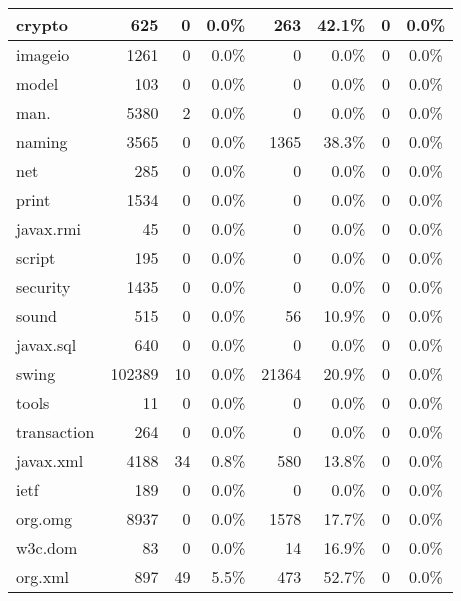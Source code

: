\begin{table}[t]
\begin{SmallOut}
\begin {tabular} {|p{3.6em}|r|r|r|r|r|c|c|}
\hline
crypto        &  \hfill 625   &  0    &  0.0\%  &  263  &  42.1\%  &  0    & 0.0\%\\
\hline
imageio      &  \hfill 1261   &  0    &  0.0\%  &  0    &  0.0\%  & 0      & 0.0\%\\
\hline
model       &  \hfill 103    & 0     &  0.0\%  & 0     &  0.0\%  & 0    & 0.0\%\\
\hline
man.   &  \hfill 5380   & 2    &   0.0\%  & 0     &  0.0\%  & 0    & 0.0\%  \\
\hline
naming       &  \hfill 3565   & 0    &   0.0\%  & 1365   &  38.3\%  &  0    & 0.0\%  \\
\hline
net           &  \hfill 285    & 0     &  0.0\%  &  0     &  0.0\%   &  0   & 0.0\%\\
\hline
print         &  \hfill 1534   & 0     &  0.0\%  &  0    &  0.0\%   &  0   & 0.0\% \\
\hline
javax.rmi           &  \hfill 45     &  0    &  0.0\%  & 0     &  0.0\%   & 0   & 0.0\%\\
\hline
script         &  \hfill 195   & 0     &  0.0\% &  0     &  0.0\%  & 0  & 0.0\%\\
\hline
security       &  \hfill 1435  & 0     &  0.0\%  & 0     &  0.0\%  & 0    & 0.0\%\\
\hline
sound          &  \hfill 515   & 0    &  0.0\%  & 56    &  10.9\%  & 0   & 0.0\%  \\
\hline
javax.sql            &  \hfill 640   & 0    &  0.0\%  & 0     &  0.0\%   & 0   & 0.0\%  \\
\hline
swing          &  102389& 10   &  0.0\%  &  21364 &  20.9\%   &  0   & 0.0\%\\
\hline
tools          &  \hfill 11    & 0     &  0.0\%  &  0    &  0.0\%   &  0   & 0.0\% \\
\hline
transaction    &  \hfill 264   &  0    &  0.0\%  & 0     &  0.0\%   & 0   & 0.0\%\\
\hline
javax.xml            &  \hfill 4188  &  34   &  0.8\% &  580   &  13.8\%  & 0  & 0.0\%\\
\hline
ietf        & \hfill  189   & 0     &  0.0\%  & 0     &  0.0\%  & 0    & 0.0\%\\
\hline
org.omg              &  \hfill 8937   & 0    &  0.0\%  & 1578  &  17.7\%  & 0   & 0.0\%  \\
\hline
w3c.dom          &  \hfill 83     & 0    &  0.0\%  & 14     &  16.9\%   & 0   & 0.0\%  \\
\hline
org.xml             &   \hfill 897    & 49   &  5.5\%  & 473    & 52.7\%    & 0   & 0.0\%\\
\hline
\end{tabular}\vspace*{-2ex}
 \label{table:package}
\end{SmallOut}\vspace*{-2ex}
\end{table}


